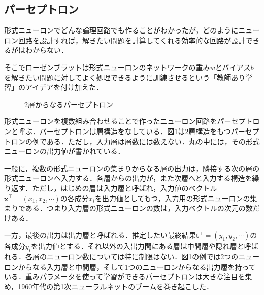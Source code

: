 \documentclass[a4paper,11pt]{jsreport}
\begin{document}
\subsection{パーセプトロン}
形式ニューロンでどんな論理回路でも作ることがわかったが，どのようにニューロン回路を設計すれば，解きたい問題を計算してくれる効率的な回路が設計できるがはわからない．\par
そこでローゼンブラットは形式ニューロンのネットワークの重み$w$とバイアス$b$を解きたい問題に対してよく処理できるように訓練させるという「教師あり学習」のアイデアを付け加えた．\par
\begin{figure}
  \begin{center}
    \centering
    \caption{2層からなるパーセプトロン}
    \label{2層パーセプトロン}
  \end{center}
\end{figure}
形式ニューロンを複数組み合わせることで作ったニューロン回路をパーセプトロンと呼ぶ．パーセプトロンは層構造をなしている．図\ref{2層パーセプトロン}は2層構造をもつパーセプトロンの例である．ただし，入力層は層数には数えない．丸の中には，その形式ニューロンの出力値が書かれている．\par
一般に，複数の形式ニューロンの集まりからなる層の出力は，隣接する次の層の形式ニューロンへ入力する．各層からの出力が，また次層へと入力する構造を繰り返す．ただし，はじめの層は入力層と呼ばれ，入力値のベクトル$\bm{x}^{\top}=(x_1, x_2, \cdots)$の各成分$x_i$を出力値としてもつ，入力用の形式ニューロンの集まりである．つまり入力層の形式ニューロンの数は，入力ベクトルの次元の数だけある．\par
一方，最後の出力は出力層と呼ばれる．推定したい最終結果$\bm{t}^{\top}=(y_1, y_2, \cdots)$の各成分$y_i$を出力値とする．それ以外の入出力間にある層は中間層や隠れ層と呼ばれる．各層のニューロン数については特に制限はない．図\ref{2層パーセプトロン}の例では2つのニューロンからなる入力層と中間層，そして1つのニューロンからなる出力層を持っている．重みパラメータを使って学習ができるパーセプトロンは大きな注目を集め，1960年代の第1次ニューラルネットのブームを巻き起こした．
\end{document}
